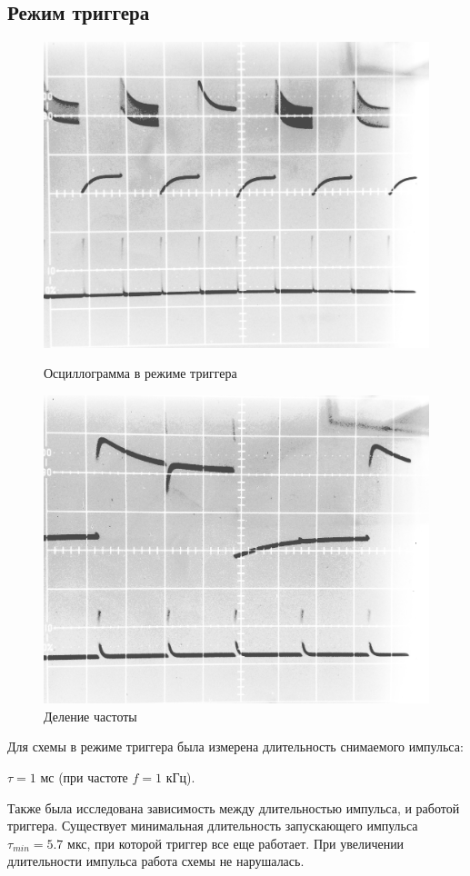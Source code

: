 \subsection*{Режим триггера}

\begin{figure}[H]
	\begin{minipage}{.49\linewidth}
		\centering
		\includegraphics[width = .7\linewidth]{img/3.jpg}
		\caption{Осциллограмма в режиме триггера}
		\label{fig:2}
	\end{minipage}
	\begin{minipage}{.49\linewidth}
		\centering
		\includegraphics[width = .7\linewidth]{img/8.jpg}
		\caption{Деление частоты}
		\label{fig:3}
	\end{minipage}

\end{figure}

Для схемы в режиме триггера была измерена длительность снимаемого импульса:

$\tau = 1$ мс (при частоте $f = 1$ кГц).

Также была исследована зависимость между длительностью импульса, и работой триггера. Существует минимальная длительность
запускающего импульса $\tau_{min} = 5.7$ мкс, при которой триггер все еще работает. При увеличении длительности
импульса работа схемы не нарушалась.

